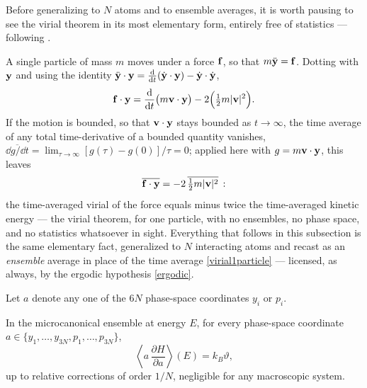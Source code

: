 Before generalizing to $N$ atoms and to ensemble averages, it is worth pausing to see the virial theorem in its most elementary form, entirely free of statistics --- following \cite{PodioGuidugli2019}.

\begin{example}\label{ex:virial1particle}
	A single particle of mass $m$ moves under a force $\mathbf{f}$, so that $m\ddot{\mathbf{y}}=\mathbf{f}$. Dotting with $\mathbf{y}$ and using the identity $\ddot{\mathbf{y}}\cdot\mathbf{y}=\tfrac{\mathrm{d}}{\mathrm{d} t}(\dot{\mathbf{y}}\cdot\mathbf{y})-\dot{\mathbf{y}}\cdot\dot{\mathbf{y}}$,
	\begin{equation}
		\mathbf{f}\cdot\mathbf{y} = \frac{\mathrm{d}}{\mathrm{d} t}\big(m\mathbf{v}\cdot\mathbf{y}\big) - 2\Big(\tfrac12m|\mathbf{v}|^2\Big).
	\end{equation}
	If the motion is bounded, so that $\mathbf{v}\cdot\mathbf{y}$ stays bounded as $t\to\infty$, the time average of any total time-derivative of a bounded quantity vanishes, $\overline{\dd g/\dd t}=\lim_{\tau\to\infty}[g(\tau)-g(0)]/\tau=0$; applied here with $g=m\mathbf{v}\cdot\mathbf{y}$, this leaves
	\begin{equation}\label{virial1particle}
		\overline{\mathbf{f}\cdot\mathbf{y}} = -2\,\overline{\tfrac12m|\mathbf{v}|^2}\,:
	\end{equation}
	the time-averaged virial of the force equals minus twice the time-averaged kinetic energy --- the virial theorem, for one particle, with no ensembles, no phase space, and no statistics whatsoever in sight. Everything that follows in this subsection is the same elementary fact, generalized to $N$ interacting atoms and recast as an \textit{ensemble} average in place of the time average \eqref{virial1particle} --- licensed, as always, by the ergodic hypothesis \eqref{ergodic}.
\end{example}

Let $a$ denote any one of the $6N$ phase-space coordinates $y_i$ or $p_i$.

\begin{theorem}\label{thm:equipartition}
	In the microcanonical ensemble at energy $E$, for every phase-space coordinate $a\in\{y_1,\ldots,y_{3N},p_1,\ldots,p_{3N}\}$,
	\begin{equation}\label{genequipartition}
		\left\langle a\,\frac{\partial H}{\partial a}\right\rangle(E) = k_B\vartheta,
	\end{equation}
	up to relative corrections of order $1/N$, negligible for any macroscopic system.
\end{theorem}


